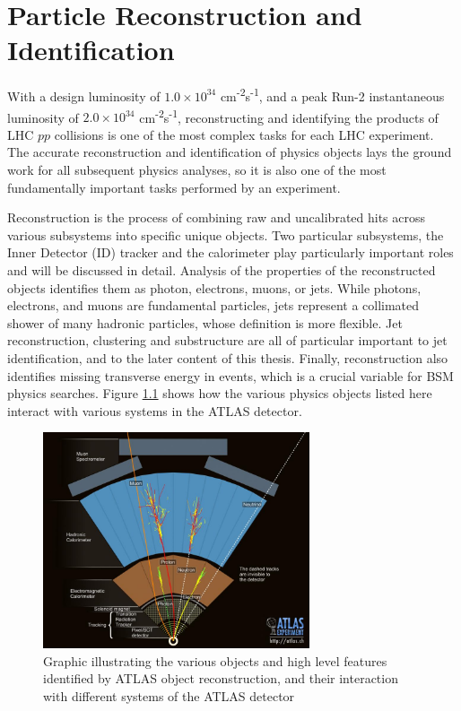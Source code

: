 \chapter{Particle Reconstruction and Identification}
\label{ch:part_reco}

With a design luminosity of $1.0 \times 10^{34}$ cm\textsuperscript{-2}s\textsuperscript{-1}, and a peak Run-2 instantaneous luminosity of $2.0 \times 10^{34}$ cm\textsuperscript{-2}s\textsuperscript{-1}, reconstructing and identifying the products of LHC $pp$ collisions is one of the most complex tasks for each LHC experiment. The accurate reconstruction and identification of physics objects lays the ground work for all subsequent physics analyses, so it is also one of the most fundamentally important tasks performed by an experiment. \par

Reconstruction is the process of combining raw and uncalibrated hits across various subsystems into specific unique objects. Two particular subsystems, the Inner Detector (ID) tracker and the calorimeter play particularly important roles and will be discussed in detail. Analysis of the properties of the reconstructed objects identifies them as photon, electrons, muons, or jets. While photons, electrons, and muons are fundamental particles, jets represent a collimated shower of many hadronic particles, whose definition is more flexible. Jet reconstruction, clustering and substructure are all of particular important to jet identification, and to the later content of this thesis. Finally, reconstruction also identifies missing transverse energy \met in events, which is a crucial variable for BSM physics searches. Figure \ref{fig:detector_objects} shows how the various physics objects listed here interact with various systems in the ATLAS detector. 

\begin{figure}
        \centering
	\includegraphics[width=0.7\textwidth]{figures/ch5/detector_objects}
	\caption{Graphic illustrating the various objects and high level features identified by ATLAS object reconstruction, and their interaction with different systems of the ATLAS detector \cite{detector_events}}
	\label{fig:detector_objects}
\end{figure}

